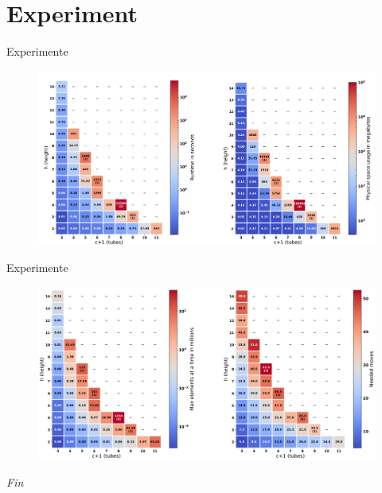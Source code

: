 \documentclass{beamer}
\begin{document}
\section*{Experiment}
\begin{frame}{Experimente}
\begin{figure}
    \centering
    \includegraphics[width=\textwidth]{topexp}
\end{figure}
\end{frame}


\begin{frame}{Experimente}
\begin{figure}
    \centering
    \includegraphics[width=\textwidth]{botexp}
\end{figure}
\end{frame}

\begin{frame}{}
  \centering \Huge
  \emph{Fin}
\end{frame}


	
    	
    	
    	
\end{document}
